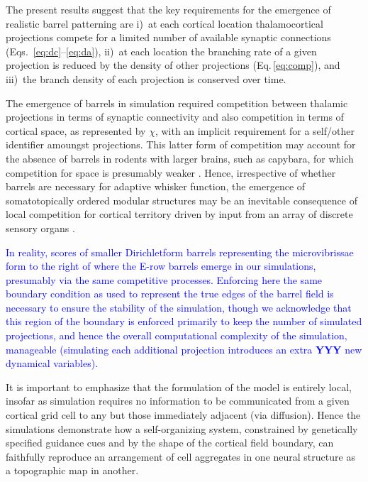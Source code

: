 \documentclass[9pt,lineno]{elife}
\newcommand{\cmnt}[1]{\textcolor{blue}{#1}}
\begin{document}
The present results suggest that the key requirements for the emergence of
realistic barrel patterning are i)~at each cortical location thalamocortical
projections compete for a limited number of available synaptic connections
(Eqs.~\ref{eq:dc}--\ref{eq:da}), ii)~at each location the branching rate of a
given projection is reduced by the density of other projections
(Eq.\,\ref{eq:comp}), and iii)~the branch density of each projection is
conserved over time.

The emergence of barrels in simulation required competition between thalamic
projections in terms of synaptic connectivity and also competition in terms of
cortical space, as represented by $\chi$, with an implicit requirement for a
self/other identifier amoungst projections. This latter form of competition may account for the absence of barrels in rodents with larger brains, such as
capybara, for which competition for space is presumably weaker
\citep{woolsey_comparative_1975}. Hence, irrespective of whether barrels are
necessary for adaptive whisker function, the emergence of somatotopically
ordered modular structures may be an inevitable consequence of local
competition for cortical territory driven by input from an array of discrete
sensory organs \citep{purves_iterated_1992}.

\cmnt{In reality, scores of smaller Dirichletform barrels representing the
  microvibrissae form to the right of where the E-row barrels emerge in our
  simulations, presumably via the same competitive processes. Enforcing here
  the same boundary condition as used to represent the true edges of the
  barrel field is necessary to ensure the stability of the simulation, though
  we acknowledge that this region of the boundary is enforced primarily to
  keep the number of simulated projections, and hence the overall
  computational complexity of the simulation, manageable (simulating each
  additional projection introduces an extra \textbf{YYY} new dynamical
  variables).}

It is important to emphasize that the formulation of the model is entirely
local, insofar as simulation requires no information to be communicated from a
given cortical grid cell to any but those immediately adjacent (via
diffusion). Hence the simulations demonstrate how a self-organizing system,
constrained by genetically specified guidance cues and by the shape of the
cortical field boundary, can faithfully reproduce an arrangement of cell
aggregates in one neural structure as a topographic map in another.
\end{document}
